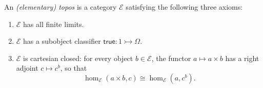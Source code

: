 An \textit{(elementary) topos} is a category $\mathcal{E}$ satisfying the following three axioms:

\begin{enumerate}
\item[(i)] $\mathcal{E}$ has all finite limits.
\item[(ii)] $\mathcal{E}$ has a subobject classifier $\mathsf{true} : 1 \rightarrowtail \Omega$.
\item[(iii)] $\mathcal{E}$ is cartesian closed: for every object $b \in \mathcal{E}$, the functor $a \mapsto a \times b$ has a right adjoint $c \mapsto c^b$, so that
$$
\hom_{\mathcal{E}}(a \times b, c) \cong \hom_{\mathcal{E}}(a, c^b).
$$
\end{enumerate}
